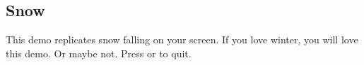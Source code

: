\subsection{Snow}
This demo replicates snow falling on your screen. If you love winter,
you will love this demo.  Or maybe not.
Press \PluginCancel{} or \PluginExit{} to quit.


